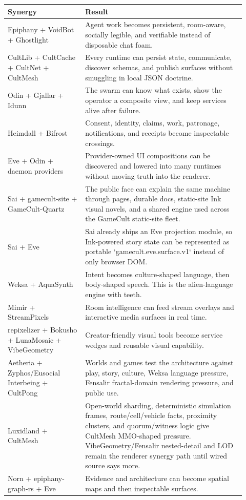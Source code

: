 \documentclass[11pt,oneside]{article}
\begin{document}
\begin{longtable}{p{0.30\linewidth}p{0.62\linewidth}}
\toprule
Synergy & Result\\
\midrule
Epiphany + VoidBot + Ghostlight & Agent work becomes persistent, room-aware, socially legible, and verifiable instead of disposable chat foam.\\
CultLib + CultCache + CultNet + CultMesh & Every runtime can persist state, communicate, discover schemas, and publish surfaces without smuggling in local JSON doctrine.\\
Odin + Gjallar + Idunn & The swarm can know what exists, show the operator a composite view, and keep services alive after failure.\\
Heimdall + Bifrost & Consent, identity, claims, work, patronage, notifications, and receipts become inspectable crossings.\\
Eve + Odin + daemon providers & Provider-owned UI compositions can be discovered and lowered into many runtimes without moving truth into the renderer.\\
Sai + gamecult-site + GameCult-Quartz & The public face can explain the same machine through pages, durable docs, static-site Ink visual novels, and a shared engine used across the GameCult static-site fleet.\\
Sai + Eve & Sai already ships an Eve projection module, so Ink-powered story state can be represented as portable `gamecult.eve.surface.v1` instead of only browser DOM.\\
Weksa + AquaSynth & Intent becomes culture-shaped language, then body-shaped speech. This is the alien-language engine with teeth.\\
Mimir + StreamPixels & Room intelligence can feed stream overlays and interactive media surfaces in real time.\\
repixelizer + Bokusho + LunaMosaic + VibeGeometry & Creator-friendly visual tools become service wedges and reusable visual capability.\\
Aetheria + Zyphos/Eusocial Interbeing + CultPong & Worlds and games test the architecture against play, story, culture, Weksa language pressure, Fensalir fractal-domain rendering pressure, and public use.\\
Luxidland + CultMesh & Open-world sharding, deterministic simulation frames, route/cell/vehicle facts, proximity clusters, and quorum/witness logic give CultMesh MMO-shaped pressure. VibeGeometry/Fensalir nested-detail and LOD remain the renderer synergy path until wired source says more.\\
Norn + epiphany-graph-rs + Eve & Evidence and architecture can become spatial maps and then inspectable surfaces.\\
\bottomrule
\end{longtable}
\end{document}
